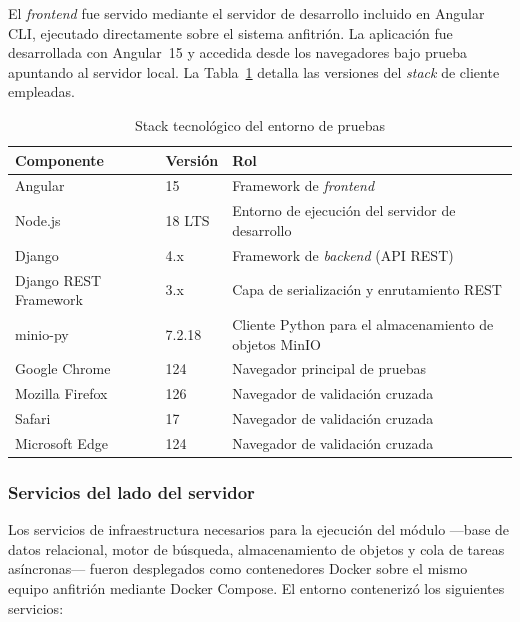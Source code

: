 El \textit{frontend} fue servido mediante el servidor de desarrollo incluido en Angular CLI,
ejecutado directamente sobre el sistema anfitrión. La aplicación fue desarrollada con Angular~15
y accedida desde los navegadores bajo prueba apuntando al servidor local. La Tabla~\ref{tab:entorno_sw}
detalla las versiones del \textit{stack} de cliente empleadas.

\begin{table}[htbp]
\centering
\caption{Stack tecnológico del entorno de pruebas}
\label{tab:entorno_sw}
\begin{tabular}{|l|l|l|}
\hline
\textbf{Componente} & \textbf{Versión} & \textbf{Rol} \\
\hline
Angular             & 15               & Framework de \textit{frontend} \\
\hline
Node.js             & 18 LTS           & Entorno de ejecución del servidor de desarrollo \\
\hline
Django              & 4.x              & Framework de \textit{backend} (API REST) \\
\hline
Django REST Framework & 3.x            & Capa de serialización y enrutamiento REST \\
\hline
minio-py            & 7.2.18           & Cliente Python para el almacenamiento de objetos MinIO \\
\hline
Google Chrome       & 124              & Navegador principal de pruebas \\
\hline
Mozilla Firefox     & 126              & Navegador de validación cruzada \\
\hline
Safari              & 17               & Navegador de validación cruzada \\
\hline
Microsoft Edge      & 124              & Navegador de validación cruzada \\
\hline
\end{tabular}
\end{table}

\subsubsection*{Servicios del lado del servidor}

Los servicios de infraestructura necesarios para la ejecución del módulo ---base de datos
relacional, motor de búsqueda, almacenamiento de objetos y cola de tareas asíncronas--- fueron
desplegados como contenedores Docker sobre el mismo equipo anfitrión mediante Docker Compose.
El entorno contenerizó los siguientes servicios:

